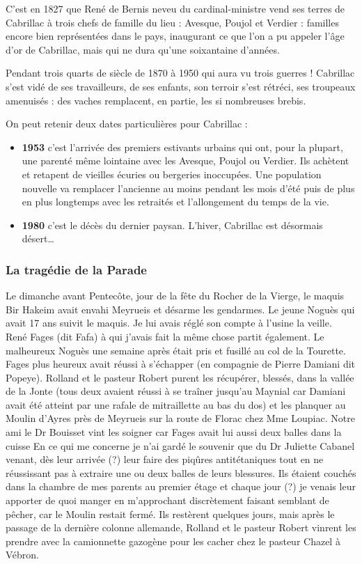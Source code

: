 C’est en 1827 que René de Bernis neveu du cardinal-ministre vend ses terres de Cabrillac à
trois chefs de famille du lieu : Avesque, Poujol et Verdier : familles encore bien représentées
dans le pays, inaugurant ce que l’on a pu appeler l’âge d’or de Cabrillac, mais qui ne dura
qu’une soixantaine d’années.

Pendant trois quarts de siècle de 1870 à 1950 qui aura vu trois guerres ! Cabrillac s’est vidé de
ses travailleurs, de ses enfants, son terroir s’est rétréci, ses troupeaux amenuisés : des vaches
remplacent, en partie, les si nombreuses brebis.

On peut retenir deux dates particulières pour Cabrillac : 

\begin{itemize}
\item \textbf{1953} c’est l’arrivée des premiers
estivants urbains qui ont, pour la plupart, une parenté même lointaine avec les Avesque,
Poujol ou Verdier. Ils achètent et retapent de vieilles écuries ou bergeries inoccupées. Une
population nouvelle va remplacer l’ancienne au moins pendant les mois d’été puis de plus en
plus longtemps avec les retraités et l’allongement du temps de la vie.
\item \textbf{1980} c’est le décès du dernier paysan. L’hiver, Cabrillac est désormais désert…
\end{itemize}

\subsubsection{La tragédie de la Parade}

Le dimanche avant Pentecôte, jour de la fête du Rocher de la Vierge, le maquis Bir Hakeim
avait envahi Meyrueis et désarme les gendarmes. Le jeune Noguès qui avait 17 ans suivit le
maquis. Je lui avais réglé son compte à l’usine la veille. René Fages (dit Fafa) à qui j’avais
fait la même chose partit également. Le malheureux Noguès une semaine après était pris et
fusillé au col de la Tourette. Fages plus heureux avait réussi à s’échapper (en compagnie de
Pierre Damiani dit Popeye). Rolland et le pasteur Robert purent les récupérer, blessés,
dans la vallée de la Jonte (tous deux avaient réussi à se traîner jusqu’au Maynial car
Damiani avait été atteint par une rafale de mitraillette au bas du dos) et les planquer au
Moulin d’Ayres près de Meyrueis sur la route de Florac chez Mme Loupiac.
Notre ami le Dr Bouisset vint les soigner car Fages avait lui aussi deux balles dans la cuisse
En ce qui me concerne je n’ai gardé le souvenir que du Dr Juliette Cabanel venant, dès leur
arrivée (?) leur faire des piqûres antitétaniques tout en ne réussissant pas à extraire une ou
deux balles de leurs blessures. Ils étaient couchés dans la chambre de mes parents au premier
étage et chaque jour (?) je venais leur apporter de quoi manger en m’approchant
discrètement faisant semblant de pêcher, car le Moulin restait fermé. Ils restèrent quelques
jours, mais après le passage de la dernière colonne allemande, Rolland et le pasteur Robert
vinrent les prendre avec la camionnette gazogène pour les cacher chez le pasteur Chazel à
Vébron.

